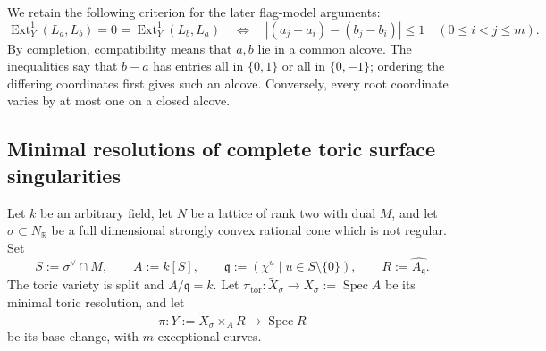 \documentclass[a4paper,reqno]{amsart}
\DeclareMathOperator{\Ext}{Ext}
\DeclareMathOperator{\Spec}{Spec}
\theoremstyle{definition}
\begin{document}
We retain the following criterion for the later flag-model arguments:
\begin{equation}\label{eq:line-compatibility}
\Ext_Y^1(L_a,L_b)=0=\Ext_Y^1(L_b,L_a)
\quad\Longleftrightarrow\quad
|(a_j-a_i)-(b_j-b_i)|\le1
\quad(0\le i<j\le m).
\end{equation}
By completion, compatibility means that $a,b$ lie in a common alcove. The inequalities say that $b-a$ has entries all in $\{0,1\}$ or all in $\{0,-1\}$; ordering the differing coordinates first gives such an alcove. Conversely, every root coordinate varies by at most one on a closed alcove.

\subsection{Minimal resolutions of complete toric surface singularities}\label{sec:toric-surfaces}

Let $k$ be an arbitrary field, let $N$ be a lattice of rank two with dual $M$, and let $\sigma\subset N_{\mathbb R}$ be a full dimensional strongly convex rational cone which is not regular. Set
\begin{equation}\label{eq:complete-toric-surface}
S:=\sigma^\vee\cap M,\qquad A:=k[S],\qquad
\mathfrak q:=(\chi^u\mid u\in S\setminus\{0\}),\qquad
R:=\widehat{A_{\mathfrak q}}.
\end{equation}
The toric variety is split and $A/\mathfrak q=k$. Let $\pi_{\mathrm{tor}}\colon\widetilde X_\sigma\to X_\sigma:=\Spec A$ be its minimal toric resolution, and let
\[
\pi\colon Y:=\widetilde X_\sigma\times_A R\longrightarrow\Spec R
\]
be its base change, with $m$ exceptional curves.
\end{document}
